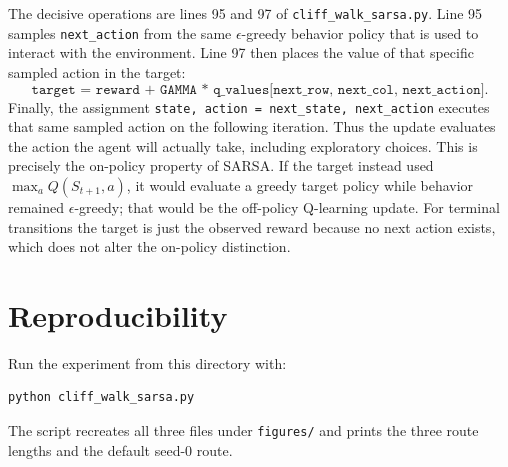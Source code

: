 \documentclass[11pt]{article}
\begin{document}
The decisive operations are lines 95 and 97 of
\texttt{cliff\_walk\_sarsa.py}.  Line 95 samples
\texttt{next\_action} from the same $\epsilon$-greedy behavior policy that is
used to interact with the environment.  Line 97 then places the value of that
specific sampled action in the target:
\[
\texttt{target = reward + GAMMA *
q\_values[next\_row, next\_col, next\_action]}.
\]
Finally, the assignment
\texttt{state, action = next\_state, next\_action} executes that same sampled
action on the following iteration.  Thus the update evaluates the action the
agent will actually take, including exploratory choices.  This is precisely
the on-policy property of SARSA.  If the target instead used
$\max_a Q(S_{t+1},a)$, it would evaluate a greedy target policy while behavior
remained $\epsilon$-greedy; that would be the off-policy Q-learning update.
For terminal transitions the target is just the observed reward because no
next action exists, which does not alter the on-policy distinction.

\section{Reproducibility}

Run the experiment from this directory with:
\begin{verbatim}
python cliff_walk_sarsa.py
\end{verbatim}
The script recreates all three files under \texttt{figures/} and prints the
three route lengths and the default seed-0 route.
\end{document}
